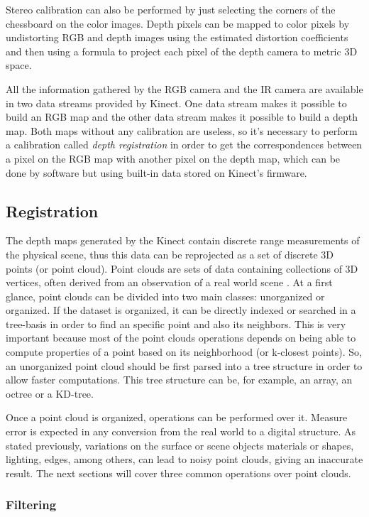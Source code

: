 \documentclass[msc, a4paper, classic, en]{ufbathesis}
\begin{document}
Stereo calibration can also be performed by just selecting the corners of the chessboard on the color images. Depth pixels can be mapped to color pixels by undistorting RGB and depth images using the estimated distortion coefficients and then using a formula to project each pixel of the depth camera to metric 3D space.

All the information gathered by the RGB camera and the IR camera are available in two data streams provided by Kinect. One data stream makes it possible to build an RGB map and the other data stream makes it possible to build a depth map. Both maps without any calibration are useless, so it's necessary to perform a calibration called \textit{depth registration} in order to get the correspondences between a pixel on the RGB map with another pixel on the depth map, which can be done by software but using built-in data stored on Kinect's firmware.

\subsection{Registration}

The depth maps generated by the Kinect contain discrete range measurements of the physical scene, thus this data can be reprojected as a set of discrete 3D points (or point cloud). Point clouds are sets of data containing collections of 3D vertices, often derived from an observation of a real world scene \cite{price2012}. At a first glance, point clouds can be divided into two main classes: unorganized or organized. If the dataset is organized, it can be directly indexed or searched in a tree-basis in order to find an specific point and also its neighbors. This is very important because most of the point clouds operations depends on being able to compute properties of a point based on its neighborhood (or k-closest points). So, an unorganized point cloud should be first parsed into a tree structure in order to allow faster computations. This tree structure can be, for example, an array, an octree or a KD-tree.

Once a point cloud is organized, operations can be performed over it. Measure error is expected in any conversion from the real world to a digital structure. As stated previously, variations on the surface or scene objects materials or shapes, lighting, edges, among others, can lead to noisy point clouds, giving an inaccurate result. The next sections will cover three common operations over point clouds.

\subsubsection{Filtering}
\end{document}
